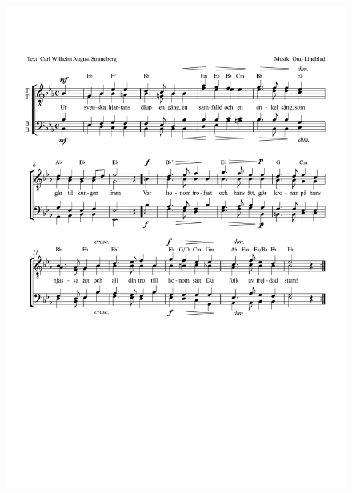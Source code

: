\documentclass[a6paper,11pt]{article}
\begin{document}
\setlength{\oddsidemargin}{-0.67in}
\begin{center}
\end{center}
\vspace{-40pt}
\begin{figure}[!h]
\centering
\includegraphics[width=\textwidth]{kungssangen}
\end{figure}
\end{document}
